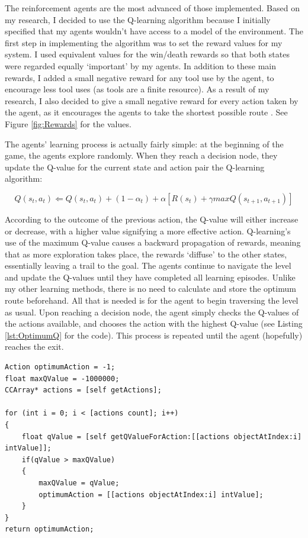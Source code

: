 \documentclass[a4paper,oneside]{report}
\begin{document}
The reinforcement agents are the most advanced of those implemented. Based on my research, I decided to use the Q-learning algorithm because I initially specified that my agents wouldn't have access to a model of the environment. The first step in implementing the algorithm was to set the reward values for my system. I used equivalent values for the win/death rewards so that both states were regarded equally `important' by my agents. In addition to these main rewards, I added a small negative reward for any tool use by the agent, to encourage less tool uses (as tools are a finite resource). As a result of my research, I also decided to give a small negative reward for every action taken by the agent, as it encourages the agents to take the shortest possible route \cite{Ng:uq}. See Figure \ref{fig:Rewards} for the values.

The agents' learning process is actually fairly simple: at the beginning of the game, the agents explore randomly. When they reach a decision node, they update the Q-value for the current state and action pair the Q-learning algorithm:

\begin{equation*}
Q(s_t,a_t) \Leftarrow Q(s_t, a_t) + (1 -\alpha_t) + \alpha[R(s_t) + \gamma max Q(s_{t+1}, a_{t+1})] 
\end{equation*}

According to the outcome of the previous action, the Q-value will either increase or decrease, with a higher value signifying a more effective action. Q-learning's use of the maximum Q-value causes a backward propagation of rewards, meaning that as more exploration takes place, the rewards `diffuse' to the other states, essentially leaving a trail to the goal. The agents continue to navigate the level and update the Q-values until they have completed all learning episodes. Unlike my other learning methods, there is no need to calculate and store the optimum route beforehand. All that is needed is for the agent to begin traversing the level as usual. Upon reaching a decision node, the agent simply checks the Q-values of the actions available, and chooses the action with the highest Q-value (see Listing \ref{lst:OptimumQ} for the code). This process is repeated until the agent (hopefully) reaches the exit. 

\begin{lstlisting}[label={lst:OptimumQ},caption=Finding the Optimum Action For the Current State]                       
Action optimumAction = -1;
float maxQValue = -1000000;
CCArray* actions = [self getActions];
    
for (int i = 0; i < [actions count]; i++) 
{
    float qValue = [self getQValueForAction:[[actions objectAtIndex:i] intValue]];
    if(qValue > maxQValue) 
    {
        maxQValue = qValue;
        optimumAction = [[actions objectAtIndex:i] intValue];
    }
}
return optimumAction;
\end{lstlisting}
\end{document}
